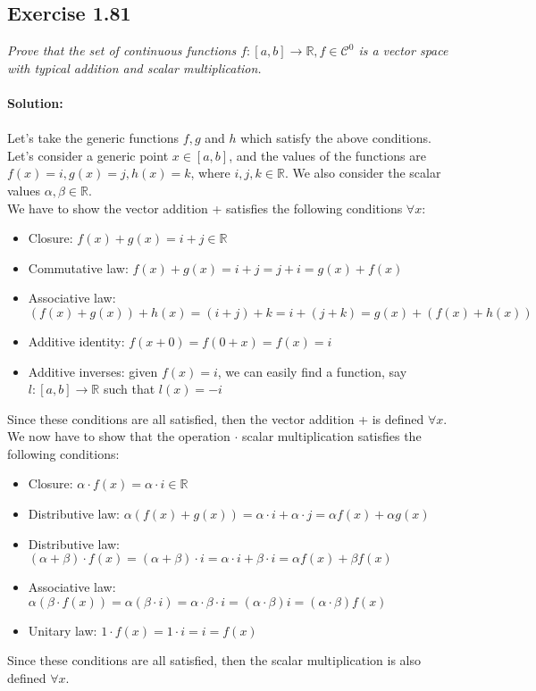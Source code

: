 \subsection{Exercise 1.81}
\emph{Prove that the set of continuous functions $f:[a,b] \to \mathbb{R}, f \in \mathcal{C}^0$ is a vector space with typical addition and scalar multiplication.}\\
\\
\textbf{Solution:}\\
\\
Let's take the generic functions $f, g$ and $h$ which satisfy the above conditions. Let's consider a generic point $x \in [a,b]$, and the values of the functions are $f(x) = i, g(x) = j, h(x) = k$, where $i, j, k \in \mathbb{R}$. We also consider the scalar values $\alpha, \beta \in \mathbb{R}$.
\\
We have to show the vector addition + satisfies the following conditions $\forall x$:
\begin{itemize}
    \item Closure: $ f(x) + g(x) = i + j \in \mathbb{R}$
    \item Commutative law: $f(x) + g(x) = i + j = j + i = g(x) + f(x)$
    \item Associative law: $(f(x) + g(x)) + h(x) = (i + j) + k = i + (j + k) = g(x) + (f(x) + h(x))$
    \item Additive identity: $f(x + 0) = f(0 + x) = f(x) = i$
    \item Additive inverses: given $f(x) = i$, we can easily find a function, say $l: [a,b] \to \mathbb{R}$ such that $l(x) = -i$
\end{itemize}
Since these conditions are all satisfied, then the vector addition + is defined $\forall x$.\\
We now have to show that the operation $\cdot$ scalar multiplication satisfies the following conditions:
\begin{itemize}
    \item Closure: $\alpha \cdot f(x) = \alpha \cdot i \in \mathbb{R}$
    \item Distributive law: $\alpha (f(x) + g(x)) = \alpha \cdot i + \alpha \cdot j = \alpha f(x) + \alpha g(x)$
    \item Distributive law: $(\alpha + \beta)\cdot f(x) = (\alpha + \beta) \cdot i = \alpha \cdot i + \beta \cdot i = \alpha f(x) + \beta f(x) $
    \item Associative law: $\alpha (\beta \cdot f(x)) = \alpha (\beta \cdot i) = \alpha \cdot \beta \cdot i =  (\alpha \cdot \beta) i =  (\alpha \cdot \beta) f(x)$
    \item Unitary law: $1 \cdot f(x) = 1 \cdot i = i = f(x)$
\end{itemize}
Since these conditions are all satisfied, then the scalar multiplication is also defined $\forall x$.
\QEDB

